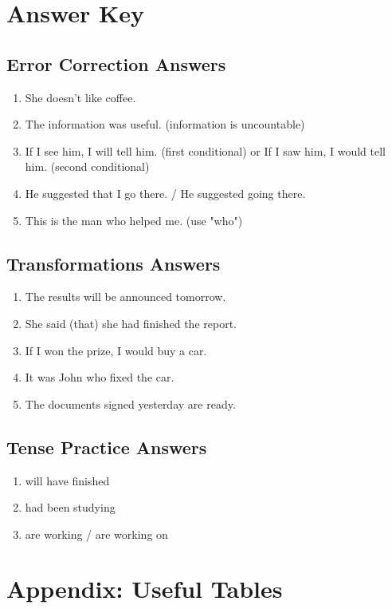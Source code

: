 \documentclass[12pt,oneside]{book}
\begin{document}
\chapter*{Answer Key}
\section*{Error Correction Answers}
\begin{enumerate}
  \item She doesn't like coffee.
  \item The information was useful. (information is uncountable)
  \item If I see him, I will tell him. (first conditional) or If I saw him, I would tell him. (second conditional)
  \item He suggested that I go there. / He suggested going there.
  \item This is the man who helped me. (use "who")
\end{enumerate}

\section*{Transformations Answers}
\begin{enumerate}
  \item The results will be announced tomorrow.
  \item She said (that) she had finished the report.
  \item If I won the prize, I would buy a car.
  \item It was John who fixed the car.
  \item The documents signed yesterday are ready.
\end{enumerate}

\section*{Tense Practice Answers}
\begin{enumerate}
  \item will have finished
  \item had been studying
  \item are working / are working on
\end{enumerate}

\chapter*{Appendix: Useful Tables}
\end{document}
